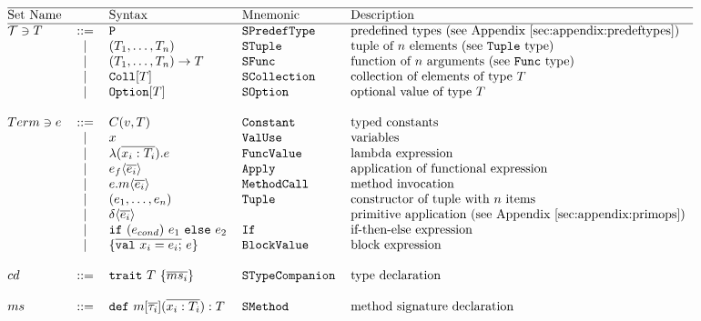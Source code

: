 \[\begin{tabular}{@{}l c l l l} 
\hline
Set Name				&  			& Syntax	& Mnemonic 		& Description \\
\hline
$\mathcal{T} \ni T$	& ::= 		& \lst{P} 	& \lst{SPredefType}	& predefined types (see Appendix~\ref{sec:appendix:predeftypes}) \\

			&	$\mid$	& $(T_1, \dots ,T_n) $	& \lst{STuple} & tuple of $n$ elements (see \lst{Tuple} type)\\

			&   $\mid$  & $(T_1,\dots,T_n) \to T $	& \lst{SFunc} & function of $n$ arguments (see \lst{Func} type) \\
			&   $\mid$  & $\text{\lst{Coll}}[T]$			& \lst{SCollection} & collection of elements of type $T$   \\
			&   $\mid$  & $\text{\lst{Option}}[T]$		& \lst{SOption} & optional value of type $T$  \\
			& 	     	&									& 				&		\\

$Term\ni e$	& ::= 		&   $C(v, T)$				& \lst{Constant} & typed constants  \\
			& 	$\mid$ 	& 	$x$ 					& \lst{ValUse} & variables  \\
			& 	$\mid$ 	& 	$\TyLam{x_i}{T_i}{e}$ 		& \lst{FuncValue} & lambda expression \\
			& 	$\mid$ 	& 	$\Apply{e_f}{\Ov{e_i}}$ 	& \lst{Apply} & application of functional expression \\
			& 	$\mid$ 	& 	$\Apply{e.m}{\Ov{e_i}}$		& \lst{MethodCall} & method invocation  \\
			& 	$\mid$ 	&   $\Tup{e_1, \dots ,e_n}$ 	& \lst{Tuple} & constructor of tuple with $n$ items \\
			& 	$\mid$ 	& 	$\Apply{\delta}{\Ov{e_i}}$ 	& & primitive application (see Appendix~\ref{sec:appendix:primops}) \\
			& 	$\mid$ 	& 	\lst{if} $(e_{cond})$ $e_1$ \lst{else} $e_2$ & \lst{If} & if-then-else expression \\
			& 	$\mid$ 	&   $\{ \Ov{\text{\lst{val}}~x_i = e_i;}~e\}$  & \lst{BlockValue} & block expression \\
			& 	     	&										& &				\\
$cd$   		& ::= 		& 	$\Trait{T}{\Ov{ms_i}}$				& \lst{STypeCompanion} & type declaration    \\
			& 	     	&										& &				\\
$ms$	   	& ::= 	& $\MSig{m[\Ov{\tau_i}]}{\overline{x_i : T_i}}{T}$ 	& \lst{SMethod} & method signature declaration   \\
\end{tabular}\] 

